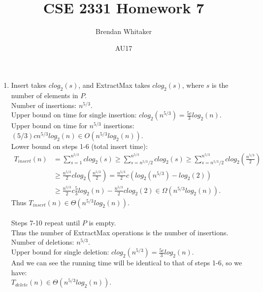 \documentclass[10pt,oneside,reqno]{amsart}
\theoremstyle{plain}
\theoremstyle{definition}
\begin{document}
\title{CSE 2331 Homework 7}

\date{AU17}

\author[Brendan Whitaker]{Brendan Whitaker}

\maketitle

\begin{enumerate}[label=\arabic*.]

\item Insert takes $clog_2(s)$, and ExtractMax takes $clog_2(s)$, where $s$ is the number of elements in $P$. \\
Number of insertions: $n^{5/3}$. \\
Upper bound on time for single insertion: $clog_2(n^{5/3}) = \frac{5c}{3}log_2(n)$. \\
Upper bound on time for $n^{5/3}$ insertions: $(5/3)cn^{5/3}log_2(n) \in O(n^{5/3}log_2(n))$. \\
Lower bound on steps 1-6 (total insert time): 
\begin{equation}
\begin{aligned}
T_{insert}(n) &= \sum_{s = 1}^{n^{5/3}} clog_2(s) \geq \sum_{s = n^{5/3}/2}^{n^{5/3}} clog_2(s) \geq \sum_{s = n^{5/3}/2}^{n^{5/3}} clog_2(\frac{n^{5/3}}{2})\\
&\geq \frac{n^{5/3}}{2}clog_2(\frac{n^{5/3}}{2}) = \frac{n^{5/3}}{2}c(log_2(n^{5/3}) - log_2(2))\\
&\geq \frac{n^{5/3}}{2}c\frac{5}{3}log_2(n) - \frac{n^{5/3}}{2}clog_2(2) \in \Omega(n^{5/3}log_2(n)). 
\end{aligned}
\end{equation}
Thus $T_{insert}(n) \in \Theta(n^{5/3}log_2(n))$. \\\\
Steps 7-10 repeat until $P$ is empty. \\
Thus the number of ExtractMax operations is the number of insertions. \\
Number of deletions: $n^{5/3}$. \\
Upper bound for single deletion: $clog_2(n^{5/3}) = \frac{5c}{3}log_2(n)$. \\
And we can see the running time will be identical to that of steps 1-6, so we have: \\$T_{delete}(n) \in \Theta(n^{5/3}log_2(n))$. \\


\end{enumerate}
\end{document}
